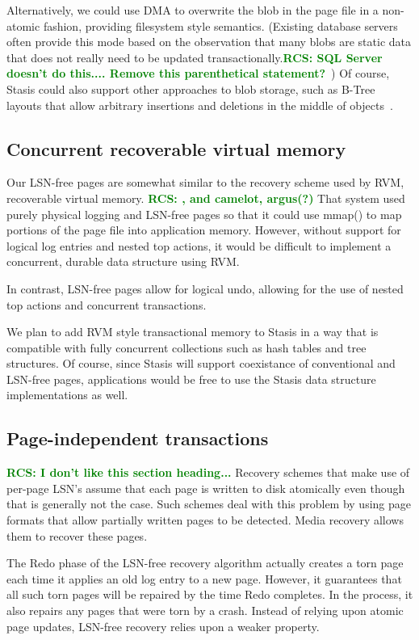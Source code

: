 \documentclass[letterpaper,twocolumn,10pt]{article}
\newcommand{\yad}{Stasis\xspace}
\newcommand{\rcs}[1]{\textcolor{green}{\bf RCS: #1}}
\begin{document}
Alternatively, we could use DMA to overwrite the blob in the page file
in a non-atomic fashion, providing filesystem style semantics.
(Existing database servers often provide this mode based on the
observation that many blobs are static data that does not really need
to be updated transactionally.\rcs{SQL Server doesn't do this.... Remove this parenthetical statement?}~\cite{sqlserver}) Of course, \yad could
also support other approaches to blob storage, such as B-Tree layouts
that allow arbitrary insertions and deletions in the middle of
objects~\cite{esm}.

\subsection{Concurrent recoverable virtual memory}

Our LSN-free pages are somewhat similar to the recovery scheme used by
RVM, recoverable virtual memory.  \rcs{, and camelot, argus(?)} That system used purely physical
logging and LSN-free pages so that it could use mmap() to map portions
of the page file into application memory\cite{lrvm}.  However, without
support for logical log entries and nested top actions, it would be
difficult to implement a concurrent, durable data structure using RVM.

In contrast, LSN-free pages allow for logical undo, allowing for the
use of nested top actions and concurrent transactions.

We plan to add RVM style transactional memory to \yad in a way that is
compatible with fully concurrent collections such as hash tables and
tree structures.  Of course, since \yad will support coexistance of
conventional and LSN-free pages, applications would be free to use the
\yad data structure implementations as well.

\subsection{Page-independent transactions}
\label{sec:torn-page}
\rcs{I don't like this section heading...}  Recovery schemes that make
use of per-page LSN's assume that each page is written to disk
atomically even though that is generally not the case.  Such schemes
deal with this problem by using page formats that allow partially
written pages to be detected.  Media recovery allows them to recover
these pages.  

The Redo phase of the LSN-free recovery algorithm actually creates a
torn page each time it applies an old log entry to a new page.
However, it guarantees that all such torn pages will be repaired by
the time Redo completes.  In the process, it also repairs any pages
that were torn by a crash.  Instead of relying upon atomic page
updates, LSN-free recovery relies upon a weaker property.
\end{document}
